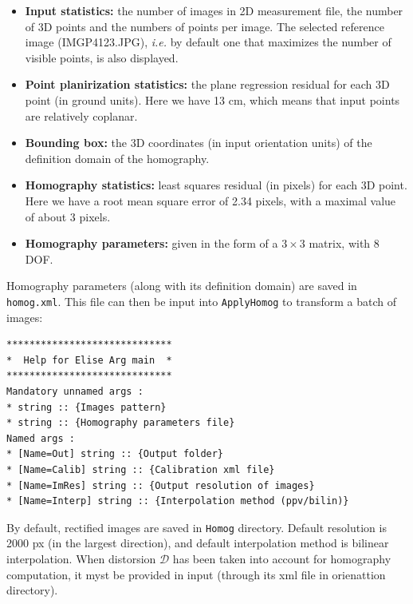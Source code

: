 \begin{itemize}
	\item \textbf{Input statistics:} the number of images in 2D measurement file, the number of 3D points and the numbers of points per image. The selected reference image (IMGP4123.JPG), \textit{i.e.} by default one that maximizes the number of visible points, is also displayed. \newline
	\item \textbf{Point planirization statistics:} the plane regression residual for each 3D point (in ground units). Here we have 13 cm, which means that input points are relatively coplanar. \newline
	\item \textbf{Bounding box:} the 3D coordinates (in input orientation units) of the definition domain of the homography. \newline
	\item \textbf{Homography statistics:} least squares residual (in pixels) for each 3D point. Here we have a root mean square error of 2.34 pixels, with a maximal value of about 3 pixels. \newline
	\item \textbf{Homography parameters:} given in the form of a $3 \times 3$ matrix, with 8 DOF. \newline
\end{itemize}

\noindent Homography parameters (along with its definition domain) are saved in \texttt{homog.xml}. This file can then be input into \texttt{ApplyHomog} to transform a batch of images: \newline

\begin{verbatim}
*****************************
*  Help for Elise Arg main  *
*****************************
Mandatory unnamed args : 
* string :: {Images pattern}
* string :: {Homography parameters file}
Named args : 
* [Name=Out] string :: {Output folder}
* [Name=Calib] string :: {Calibration xml file}
* [Name=ImRes] string :: {Output resolution of images}
* [Name=Interp] string :: {Interpolation method (ppv/bilin)}
\end{verbatim}


\noindent By default, rectified images are saved in \texttt{Homog} directory. Default resolution is 2000 px (in the largest direction), and default interpolation method is bilinear interpolation. When distorsion $\mathcal{D}$ has been taken into account for homography computation, it myst be provided in input (through its xml file in orienattion directory). \newline

